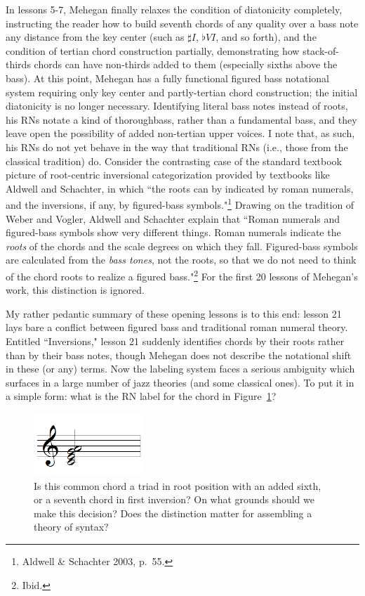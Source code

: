 In lessons 5-7, Mehegan finally relaxes the condition of diatonicity completely, instructing the reader how to build seventh chords of any quality over a bass note any distance from the key center (such as $\sharp I$, $\flat VI$, and so forth), and the condition of tertian chord construction partially, demonstrating how stack-of-thirds chords can have non-thirds added to them (especially sixths above the bass).  At this point, Mehegan has a fully functional figured bass notational system requiring only key center and partly-tertian chord construction; the initial diatonicity is no longer necessary.  Identifying literal bass notes instead of roots, his RNs notate a kind of thoroughbass, rather than a fundamental bass, and they leave open the possibility of added non-tertian upper voices.  I note that, as such, his RNs do not yet behave in the way that traditional RNs (i.e., those from the classical tradition) do.  Consider the contrasting case of the standard textbook picture of root-centric inversional categorization provided by textbooks like Aldwell and Schachter, in which ``the roots can by indicated by roman numerals, and the inversions, if any, by figured-bass symbols."\footnote{Aldwell \& Schachter 2003, p.\ 55.}  Drawing on the tradition of Weber and Vogler, Aldwell and Schachter explain that ``Roman numerals and figured-bass symbols show very different things.  Roman numerals indicate the \emph{roots} of the chords and the scale degrees on which they fall.  Figured-bass symbols are calculated from the \emph{bass tones}, not the roots, so that we do not need to think of the chord roots to realize a figured bass."\footnote{Ibid.}  For the first 20 lessons of Mehegan's work, this distinction is ignored.

My rather pedantic summary of these opening lessons is to this end: lesson 21 lays bare a conflict between figured bass and traditional roman numeral theory.  Entitled ``Inversions," lesson 21 suddenly identifies chords by their roots rather than by their bass notes, though Mehegan does not describe the notational shift in these (or any) terms.  Now the labeling system faces a serious ambiguity which surfaces in a large number of jazz theories (and some classical ones).  To put it in a simple form: what is the RN label for the chord in Figure~\ref{am_bigu}?
\begin{figure}
	\centering
	\caption{Is this common chord a triad in root position with an added sixth, or a seventh chord in first inversion?  On what grounds should we make this decision?  Does the distinction matter for assembling a theory of syntax?}
	\label{am_bigu}
	\includegraphics[width=1.6in]{diss_prospectus_cega.png}
\end{figure}

